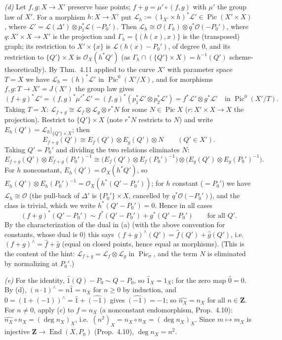 \documentclass[11pt]{article}
\begin{document}
\emph{(d)} Let $f,g:X\to X'$ preserve base points; $f+g=\mu'\circ(f,g)$ with $\mu'$ the group law of $X'$. For a morphism $h:X\to X'$ put $\mathcal L_h:=(1_{X'}\times h)^*\mathcal L'\in\operatorname{Pic}(X'\times X)$, where $\mathcal L'=\mathcal L(\Delta')\otimes p_1^*\mathcal L(-P_0')$. Then $\mathcal L_h\cong\mathcal O(\Gamma_h)\otimes q^*\mathcal O(-P_0')$, where $q:X'\times X\to X'$ is the projection and $\Gamma_h=\{(h(x),x)\}$ is the (transposed) graph; its restriction to $X'\times\{x\}$ is $\mathcal L(h(x)-P_0')$, of degree $0$, and its restriction to $\{Q'\}\times X$ is $\mathcal O_X(h^*Q')$ (as $\Gamma_h\cap(\{Q'\}\times X)=h^{-1}(Q')$ scheme-theoretically). By Thm.~4.11 applied to the curve $X'$ with parameter space $T=X$ we have $\mathcal L_h=(h)^*\mathcal L'$ in $\operatorname{Pic}^0(X'/X)$, and for morphisms $f,g:T\to X'=J(X')$ the group law gives
\[ (f+g)^*\mathcal L'=(f,g)^*\mu'^*\mathcal L'=(f,g)^*(p_1^*\mathcal L'\otimes p_2^*\mathcal L')=f^*\mathcal L'\otimes g^*\mathcal L'\quad\text{in }\operatorname{Pic}^0(X'/T). \]
Taking $T=X$: $\mathcal L_{f+g}\cong\mathcal L_f\otimes\mathcal L_g\otimes r^*N$ for some $N\in\operatorname{Pic}X$ ($r:X'\times X\to X$ the projection). Restrict to $\{Q'\}\times X$ (note $r^*N$ restricts to $N$) and write $E_h(Q')=\mathcal L_h|_{\{Q'\}\times X}$; then
\[ E_{f+g}(Q')\cong E_f(Q')\otimes E_g(Q')\otimes N\qquad(Q'\in X'). \]
Taking $Q'=P_0'$ and dividing the two relations eliminates $N$:
\[ E_{f+g}(Q')\otimes E_{f+g}(P_0')^{-1}\cong\bigl(E_f(Q')\otimes E_f(P_0')^{-1}\bigr)\otimes\bigl(E_g(Q')\otimes E_g(P_0')^{-1}\bigr). \]
For $h$ nonconstant, $E_h(Q')=\mathcal O_X(h^*Q')$, so $E_h(Q')\otimes E_h(P_0')^{-1}=\mathcal O_X(h^*(Q'-P_0'))$; for $h$ constant ($=P_0'$) we have $\mathcal L_h\cong\mathcal O$ (the pull-back of $\Delta'$ is $\{P_0'\}\times X$, cancelled by $q^*\mathcal O(-P_0')$), and the class is trivial, which we write $h^*(Q'-P_0')=0$. Hence in all cases
\[ (f+g)^*(Q'-P_0')\sim f^*(Q'-P_0')+g^*(Q'-P_0')\qquad\text{for all }Q'. \]
By the characterization of the dual in (a) (with the above convention for constants, whose dual is $0$) this says $(f+g)^\wedge(Q')=\hat f(Q')+\hat g(Q')$, i.e.\ $(f+g)^\wedge=\hat f+\hat g$ (equal on closed points, hence equal as morphisms). (This is the content of the hint: $\mathcal L_{f+g}=\mathcal L_f\otimes\mathcal L_g$ in $\operatorname{Pic}_\sigma$, and the term $N$ is eliminated by normalizing at $P_0'$.)

\emph{(e)} For the identity, $\hat1(Q)-P_0\sim Q-P_0$, so $\hat1_X=1_X$; for the zero map $\hat0=0$. By (d), $(n\cdot1)^\wedge=n\hat1=n_X$ for $n\ge0$ by induction, and $0=(1+(-1))^\wedge=\hat1+\widehat{(-1)}$ gives $\widehat{(-1)}=-1$; so $\widehat{n_X}=n_X$ for all $n\in\mathbf Z$. For $n\ne0$, apply (c) to $f=n_X$ (a nonconstant endomorphism, Prop.~4.10): $\widehat{n_X}\circ n_X=(\deg n_X)_X$, i.e.\ $(n^2)_X=n_X\circ n_X=(\deg n_X)_X$. Since $m\mapsto m_X$ is injective $\mathbf Z\to\operatorname{End}(X,P_0)$ (Prop.~4.10), $\deg n_X=n^2$.
\end{document}
